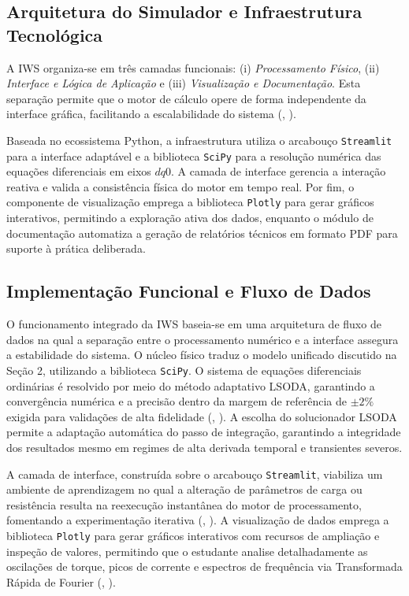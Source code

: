 \documentclass[a4paper]{ifacconf}
\begin{document}
\subsection{Arquitetura do Simulador e Infraestrutura Tecnológica}

A IWS organiza-se em três camadas funcionais: (i) \textit{Processamento Físico}, (ii) \textit{Interface e Lógica de Aplicação} e (iii) \textit{Visualização e Documentação}. Esta separação permite que o motor de cálculo opere de forma independente da interface gráfica, facilitando a escalabilidade do sistema (\citeauthor{aktaibi2011dynamic}, \citeyear{aktaibi2011dynamic}). 

Baseada no ecossistema Python, a infraestrutura utiliza o arcabouço \texttt{Streamlit} para a interface adaptável e a biblioteca \texttt{SciPy} para a resolução numérica das equações diferenciais em eixos $dq0$. A camada de interface gerencia a interação reativa e valida a consistência física do motor em tempo real. Por fim, o componente de visualização emprega a biblioteca \texttt{Plotly} para gerar gráficos interativos, permitindo a exploração ativa dos dados, enquanto o módulo de documentação automatiza a geração de relatórios técnicos em formato PDF para suporte à prática deliberada.

\subsection{Implementação Funcional e Fluxo de Dados}

O funcionamento integrado da IWS baseia-se em uma arquitetura de fluxo de dados na qual a separação entre o processamento numérico e a interface assegura a estabilidade do sistema. O núcleo físico traduz o modelo unificado discutido na Seção 2, utilizando a biblioteca \texttt{SciPy}. O sistema de equações diferenciais ordinárias é resolvido por meio do método adaptativo LSODA, garantindo a convergência numérica e a precisão dentro da margem de referência de $\pm 2\%$ exigida para validações de alta fidelidade (\citeauthor{li2010simulation}, \citeyear{li2010simulation}). A escolha do solucionador LSODA permite a adaptação automática do passo de integração, garantindo a integridade dos resultados mesmo em regimes de alta derivada temporal e transientes severos.

A camada de interface, construída sobre o arcabouço \texttt{Streamlit}, viabiliza um ambiente de aprendizagem no qual a alteração de parâmetros de carga ou resistência resulta na reexecução instantânea do motor de processamento, fomentando a experimentação iterativa (\citeauthor{tuanmohamad2024advance}, \citeyear{tuanmohamad2024advance}). A visualização de dados emprega a biblioteca \texttt{Plotly} para gerar gráficos interativos com recursos de ampliação e inspeção de valores, permitindo que o estudante analise detalhadamente as oscilações de torque, picos de corrente e espectros de frequência via Transformada Rápida de Fourier (\citeauthor{mohapatra2019steady}, \citeyear{mohapatra2019steady}).
\end{document}
